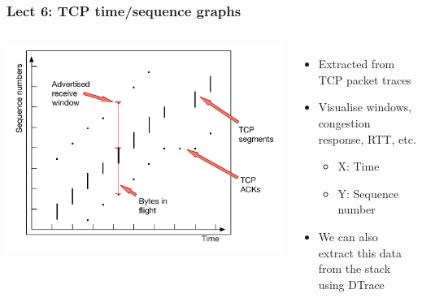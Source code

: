 \begin{frame}
  \frametitle{Lect 6: TCP time/sequence graphs}

  \begin{columns}[T]
      \bigskip
      \includegraphics[width=1.2\textwidth]{../../figures/tcp-time-sequence.pdf}

    \begin{itemize}

      \bigskip
      \pause

      \item Extracted from TCP packet traces

      \medskip
      \pause

      \item Visualise windows, congestion response, RTT, etc.
      \begin{itemize}
	\item X: Time
	\item Y: Sequence number
      \end{itemize}

      \medskip
      \pause

      \item We can also extract this data from the stack using DTrace
    \end{itemize}
  \end{columns}
\end{frame}

